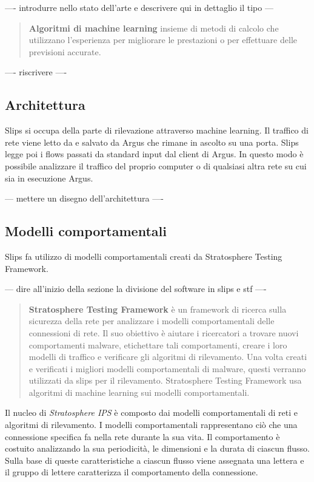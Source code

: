 \documentclass[../main.tex]{subfiles}
\begin{document}
---- introdurre nello stato dell'arte e descrivere qui in dettaglio il tipo ---
\begin{verse}
\textbf{Algoritmi di machine learning}
insieme di metodi di calcolo che utilizzano l'esperienza per migliorare le prestazioni o per effettuare delle previsioni accurate.
\end{verse}

---- riscrivere ----
\subsection{Architettura}
Slips si occupa della parte di rilevazione attraverso machine learning. Il traffico di rete viene letto da e salvato da Argus che rimane in ascolto su una porta. Slips legge poi i flows passati da standard input dal client di Argus. 
In questo modo è possibile analizzare il traffico del proprio computer o di qualsiasi altra rete su cui sia in esecuzione Argus.

--- mettere un disegno dell'architettura ----

\subsection{Modelli comportamentali}
Slips fa utilizzo di modelli comportamentali creati da Stratosphere Testing Framework.

--- dire all'inizio della sezione la divisione del software in slips e stf ----
\begin{verse}
\textbf{Stratosphere Testing Framework}
è un framework di ricerca sulla sicurezza della rete per analizzare i modelli comportamentali delle connessioni di rete. Il suo obiettivo è aiutare i ricercatori a trovare nuovi comportamenti malware, etichettare tali comportamenti, creare i loro modelli di traffico e verificare gli algoritmi di rilevamento. Una volta creati e verificati i migliori modelli comportamentali di malware, questi verranno utilizzati da slips per il rilevamento. Stratosphere Testing Framework usa algoritmi di machine learning sui modelli comportamentali.
\end{verse}

Il nucleo di \textit{Stratosphere IPS} è composto dai modelli comportamentali di reti e algoritmi di rilevamento. I modelli comportamentali rappresentano ciò che una connessione specifica fa nella rete durante la sua vita. Il comportamento è costuito analizzando la sua periodicità, le dimensioni e la durata di ciascun flusso. Sulla base di queste caratteristiche a ciascun flusso viene assegnata una lettera e il gruppo di lettere caratterizza il comportamento della connessione.
\end{document}
